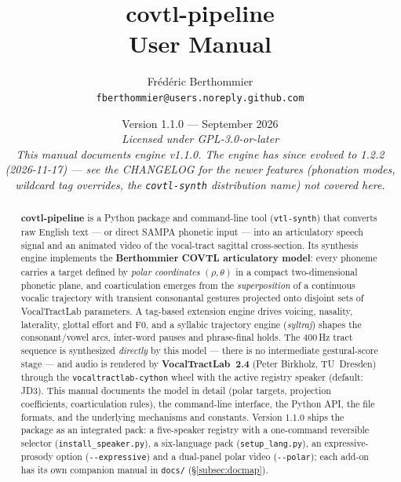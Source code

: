\documentclass[11pt,a4paper]{article}
\title{\vspace{-1cm}\Huge\bfseries\color{blue!50!black} covtl-pipeline\\[0.3em]
\Large\mdseries\color{black!70} User Manual}
\author{\large Frédéric Berthommier\\[0.3em]
\small\texttt{fberthommier@users.noreply.github.com}}
\date{\small Version 1.1.0 --- September 2026\\[0.2em]
\textit{Licensed under GPL-3.0-or-later}\\[0.4em]
\footnotesize\textit{This manual documents engine v1.1.0. The engine has
since evolved to 1.2.2 (2026-11-17) --- see the CHANGELOG for the newer
features (phonation modes, wildcard tag overrides, the
\texttt{covtl-synth} distribution name) not covered here.}}
\begin{document}
\maketitle
\thispagestyle{empty}
\vspace{0.2em}
\begin{abstract}
\noindent
\textbf{covtl-pipeline} is a Python package and command-line tool
(\texttt{vtl-synth}) that converts raw English text --- or direct SAMPA
phonetic input --- into an articulatory speech signal and an animated video
of the vocal-tract sagittal cross-section. Its synthesis engine implements
the \textbf{Berthommier COVTL articulatory model}: every phoneme carries a
target defined by \emph{polar coordinates} \((\rho,\theta)\) in a compact
two-dimensional phonetic plane, and coarticulation emerges from the
\emph{superposition} of a continuous vocalic trajectory with transient
consonantal gestures projected onto disjoint sets of VocalTractLab
parameters. A tag-based extension engine drives voicing, nasality,
laterality, glottal effort and F0, and a syllabic trajectory engine
(\emph{syltraj}) shapes the consonant/vowel arcs, inter-word pauses and
phrase-final holds. The 400\,Hz tract sequence is synthesized
\emph{directly} by this model --- there is no intermediate gestural-score
stage --- and audio is rendered by \textbf{VocalTractLab~2.4}
(Peter Birkholz, TU~Dresden) through the
\texttt{vocaltractlab-cython} wheel with the active registry speaker
(default: JD3). This manual
documents the model in detail (polar targets, projection coefficients,
coarticulation rules), the command-line interface, the Python API, the
file formats, and the underlying mechanisms and constants. Version
1.1.0 ships the package as an integrated pack: a five-speaker
registry with a one-command reversible selector
(\texttt{install\_speaker.py}), a six-language pack
(\texttt{setup\_lang.py}), an expressive-prosody option
(\texttt{-{}-expressive}) and a dual-panel polar video
(\texttt{-{}-polar}); each add-on has its own companion manual in
\texttt{docs/} (\S\ref{subsec:docmap}).
\end{abstract}
\end{document}
